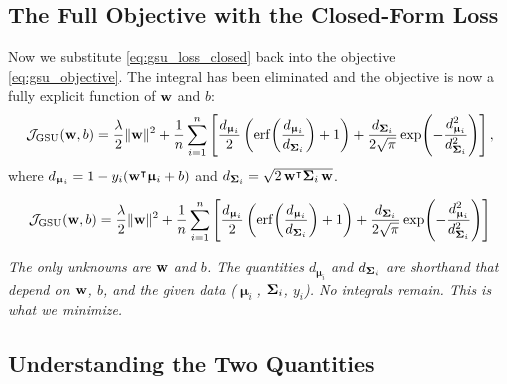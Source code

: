 \documentclass[11pt, letterpaper]{article}
\newcommand{\bSigma}{\vb{\Sigma}}
\newcommand{\bmu}{\boldsymbol{\upmu}}
\newcommand{\obj}{\mathcal{J}}
\begin{document}
\subsection{The Full Objective with the Closed-Form Loss}\label{sec:gsu_full_objective}

Now we substitute \cref{eq:gsu_loss_closed} back into the objective \cref{eq:gsu_objective}. The integral has been eliminated and the objective is now a fully explicit function of $\vb{w}$ and $b$:
\begin{equation}\label{eq:gsu_objective_closed}
    \obj_{\text{GSU}} (\vb{w}, b) = \frac{\lambda}{2}\|\vb{w}\|^2 + \frac{1}{n}\sum_{i=1}^{n}\left[\frac{d_{\bmu_i}}{2}\left(\mathrm{erf}\!\left(\frac{d_{\bmu_i}}{d_{\bSigma_i}}\right) + 1\right) + \frac{d_{\bSigma_i}}{2\sqrt{\pi}}\exp\!\left(-\frac{d_{\bmu_i}^2}{d_{\bSigma_i}^2}\right)\right],
\end{equation}
where $d_{\bmu_i} = 1 - y_i(\vb{w}^{\intercal} \bmu_i + b)$ and $d_{\bSigma_i} = \sqrt{2\, \vb{w}^{\intercal} \bSigma_i\, \vb{w}}$.

\begin{statusbox}
\vspace{-0.5em}
\begin{equation*}
    \obj_{\text{GSU}} (\vb{w}, b) = \frac{\lambda}{2}\|\vb{w}\|^2 + \frac{1}{n}\sum_{i=1}^{n}\left[\frac{d_{\bmu_i}}{2}\left(\mathrm{erf}\!\left(\frac{d_{\bmu_i}}{d_{\bSigma_i}}\right) + 1\right) + \frac{d_{\bSigma_i}}{2\sqrt{\pi}}\exp\!\left(-\frac{d_{\bmu_i}^2}{d_{\bSigma_i}^2}\right)\right]
\end{equation*}
\vspace{-1em}
\begin{center}\small
\emph{The only unknowns are $\vb{w}$ and $b$. The quantities $d_{\bmu_i}$ and $d_{\bSigma_i}$ are shorthand that depend on $\vb{w}$, $b$, and the given data ($\bmu_i$, $\bSigma_i$, $y_i$). No integrals remain. This is what we minimize.}
\end{center}
\end{statusbox}

\subsection{Understanding the Two Quantities}\label{sec:understanding_d}
\end{document}
